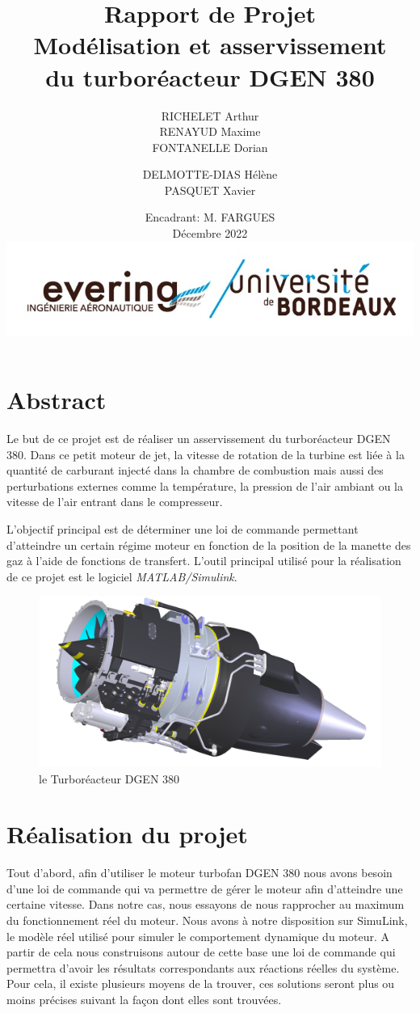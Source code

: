 \documentclass[12pt]{report}
\title{{\Huge Rapport de Projet} \\ \vspace{0.2cm} Modélisation et asservissement \\ du turboréacteur DGEN 380 }
\author{RICHELET Arthur
\\RENAYUD Maxime
\\FONTANELLE Dorian
\and
  DELMOTTE-DIAS Hélène
\\PASQUET Xavier}
\date{Encadrant: M. FARGUES \\ \vspace{0.5cm}
Décembre 2022 \\
\vspace{2cm}
\includegraphics[scale=0.4]{fig/evering_logo.jpg}}
\begin{document}
\maketitle

\tableofcontents


\newpage

\chapter{Abstract}

Le but de ce projet est de réaliser un asservissement
du turboréacteur DGEN 380.
Dans ce petit moteur de jet, la vitesse de rotation de la turbine 
est liée à la quantité de carburant injecté dans la chambre de 
combustion mais aussi des perturbations externes comme la température,
la pression de l'air ambiant ou la vitesse de l'air entrant dans le compresseur.\newline
 
L'objectif principal est de déterminer une loi de commande permettant d'atteindre un certain
régime moteur en fonction de la position de la manette des gaz à l'aide de fonctions de transfert. L'outil principal
utilisé pour la réalisation de ce projet est le logiciel {\it MATLAB/Simulink}.

\vspace{4cm}

\begin{figure}[h]
  \centering
  \includegraphics[scale=0.5,trim={0 0.2cm 0 0}]{fig/DGEN380.png}
  \caption{le Turboréacteur DGEN 380}
\end{figure}

\chapter{Réalisation du projet}

Tout d’abord, afin d’utiliser le moteur turbofan DGEN 380 nous avons besoin
d’une loi de commande qui va permettre de gérer le moteur afin d’atteindre
une certaine vitesse. Dans notre cas, nous essayons de nous rapprocher au
maximum du fonctionnement réel du moteur. Nous avons à notre disposition
sur SimuLink, le modèle réel utilisé pour simuler le comportement dynamique
du moteur. A partir de cela nous construisons 
autour de cette base une loi de commande qui permettra d’avoir les résultats
correspondants aux réactions réelles du système. Pour cela, il existe plusieurs
moyens de la trouver, ces solutions seront plus ou moins précises suivant la 
façon dont elles sont trouvées.
\end{document}
